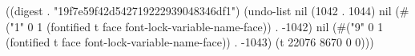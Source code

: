 
((digest . "19f7e59f42d542719222939048346df1") (undo-list nil (1042 . 1044) nil (#("1" 0 1 (fontified t face font-lock-variable-name-face)) . -1042) nil (#("9" 0 1 (fontified t face font-lock-variable-name-face)) . -1043) (t 22076 8670 0 0)))
